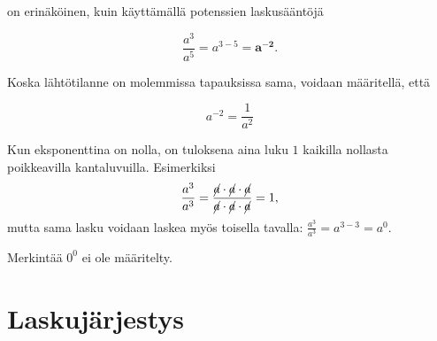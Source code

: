     on erinäköinen, kuin käyttämällä potenssien laskusääntöjä
    
    \begin{equation*}
        \frac{a^3}{a^5} = a^{3-5}=\boldsymbol {a^{-2}}{.}
    \end{equation*}
    
    Koska lähtötilanne on molemmissa tapauksissa sama, voidaan määritellä, että
    
    \begin{equation*}
        a^{-2} = \frac{1}{a^2}
    \end{equation*}
    
    
    
    Kun eksponenttina on nolla, on tuloksena aina luku $1$ kaikilla nollasta poikkeavilla kantaluvuilla. 
    Esimerkiksi
    \[
        \frac{a^3}{a^3}=\frac{\cancel{a}\cdot \cancel{a}\cdot \cancel{a}}{\cancel{a}\cdot \cancel{a}\cdot \cancel{a}}=1,
    \]
    mutta sama lasku voidaan laskea myös toisella tavalla: $\frac{a^3}{a^3}=a^{3-3}=a^0$.

Merkintää $0^0$ ei ole määritelty.
    
    
    \section{Laskujärjestys}
    
   

